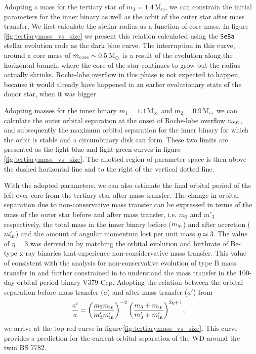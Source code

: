 \documentclass[twocolumn]{aastex62}
\newcommand{\MSun}{\mbox{M$_\odot$}}
\providecommand{\DIFadd}[1]{{\protect\color{blue}\uwave{#1}}} %
\providecommand{\DIFaddbegin}{} %
\providecommand{\DIFaddend}{} %
\begin{document}
Adopting a mass for the tertiary star of $m_3 = 1.4$\,\MSun, we can
constrain the initial parameters for the inner binary as well as the
orbit of the outer star after mass transfer. We first calculate the
stellar radius as a function of core mass. In
figure\,\ref{fig:tertiarymass_vs_size} we present this relation
calculated using the {\tt SeBa} stellar evolution code
\citep{1996A&A...309..179P} as the dark blue curve.  The interruption
in this curve, around a core mass of $m_{\rm core} \sim 0.5$\,\MSun\,
is a result of the evolution along the horizontal branch, where the
core of the star continues to grow but the \DIFaddbegin \DIFadd{stellar }\DIFaddend radius actually shrinks.
Roche-lobe overflow in this phase is not expected to happen, because
it would already have happened in an earlier evolutionary state of the
donor star, when it was bigger.

Adopting masses for the inner binary $m_1=1.1$\,\MSun\, and
$m_2=0.9$\,\MSun\, we can calculate the outer orbital separation at
the onset of Roche-lobe overflow $a_{\rm out}$, and subsequently the
maximum orbital separation for the inner binary for which the orbit is
stable and a circumbinary disk can form. These two limits are
presented as the light blue and light green curves in
figure\,\ref{fig:tertiarymass_vs_size}.  The allotted region of
parameter space is then above the dashed horizontal line and to the
right of the vertical dotted line.

With the adopted parameters, we can also estimate the final orbital
period of the left-over core from the tertiary star after mass
transfer.  The change in orbital separation due to non-conservative
mass transfer can be expressed in terms of the mass of the outer star
before and after mass transfer, i.e. $m_3$ and $m'_3$ respectively,
the total mass in the inner binary before ($m_{\rm in}$) and after
accretion ($m'_{\rm in}$) and the amount of angular momentum lost per
unit mass $\eta \simeq 3$.  The value of $\eta = 3$ was derived
  in \cite{1991A&A...241..419P,1995A&A...296..691P} by matching the
  orbital evolution and birthrate of Be-type x-ray binaries that
  experience non-considervative mass transfer. This value of
  consistent with the analysis for non-conservative evolution of type
  B mass transfer in \cite{2011A&A...527A..84K} and further
  constrained in \cite{2007ASPC..367..387P} to understand the mass
  transfer in the 100-day orbital period binary V379 Cep.  Adopting
the relation between the orbital separation before mass transfer ($a$)
and after mass transfer ($a'$) from \cite{1995A&A...296..691P}
\begin{equation}
  {a' \over a} = \left( {m_3 m_{\rm in} \over m'_3 m'_{\rm in}} \right)^{-2}
  \left( {m_3 + m_{\rm in} \over m'_3 + m'_{\rm in}} \right)^{2\eta + 1},
\end{equation}
we arrive at the top red curve in
figure\,\ref{fig:tertiarymass_vs_size}. This curve provides a prediction for 
the current orbital separation of the WD around the twin
BS 7782.
\end{document}
